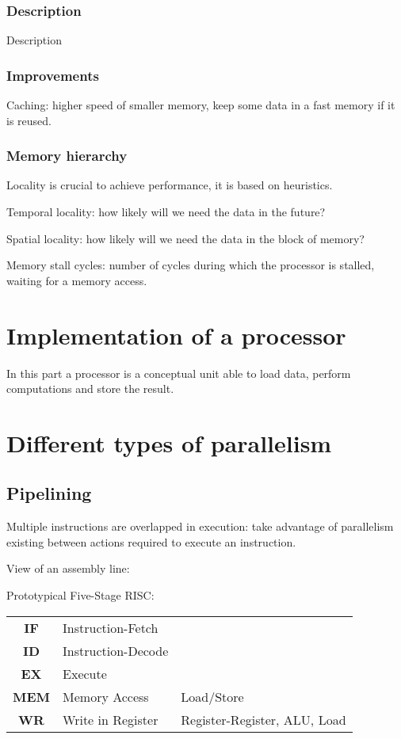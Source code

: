 \documentclass{article}
\begin{document}
\subsubsection{Description}

Description

\subsubsection{Improvements}

Caching: higher speed of smaller memory, keep some data in a fast memory if it is reused.

\subsubsection{Memory hierarchy}

Locality is crucial to achieve performance, it is based on heuristics.

Temporal locality: how likely will we need the data in the future?

Spatial locality: how likely will we need the data in the block of memory?

Memory stall cycles: number of cycles during which the processor is stalled, waiting for a memory access.

\section{Implementation of a processor}

In this part a processor is a conceptual unit able to load data, perform computations and store the result.


\section{Different types of parallelism}

\subsection{Pipelining}

Multiple instructions are overlapped in execution: take advantage of parallelism existing between actions required to execute an instruction.

View of an assembly line:

Prototypical Five-Stage RISC:
\begin{tabular}{c|l|l|}
\textbf{IF}  & Instruction-Fetch  & \\
\textbf{ID}  & Instruction-Decode & \\
\textbf{EX}  & Execute            & \\
\textbf{MEM} & Memory Access      & Load/Store \\
\textbf{WR}  & Write in Register  & Register-Register, ALU, Load\\
\end{tabular}
\end{document}
